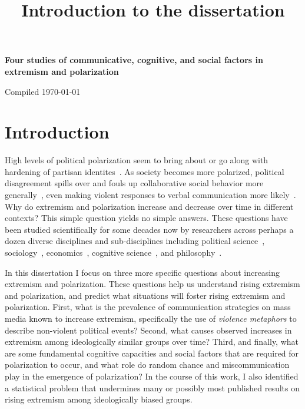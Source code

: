 \documentclass[12pt,letterpaper]{article}
\title{Introduction to the dissertation}
\date{}
\begin{document}

\vspace{-2.5in}
\textbf{Four studies of communicative, cognitive, and social factors in
extremism and polarization} 


Compiled \today

\section{Introduction}

High levels of political polarization seem to bring about or go along with
hardening of partisan identites~\cite{Lee2015}.
As society becomes more polarized, political disagreement spills over
and fouls up collaborative social behavior
more generally~\cite{Iyengar2019}, even making violent responses to verbal 
communication more likely~\cite{Kalmoe2014,Kalmoe2018,Mason2018UncivilAgreementBook}.
Why do extremism and polarization increase and decrease over time in different contexts? 
This simple question yields no simple answers. These questions
have been studied scientifically for some decades now by researchers across perhaps a dozen
diverse disciplines and sub-disciplines including 
political science~\cite{Mason2018UncivilAgreementBook,Boxell2020}, 
sociology~\cite{Baldassarri2007,Flache2011}, 
economics~\cite{Schelling1971,Dixit2007}, cognitive science~\cite{Rollwage2019}, 
and philosophy~\cite{OConnor2018}.

In this dissertation I focus
on three more specific questions about increasing extremism and polarization.
These questions help us understand rising extremism and polarization, and
predict what situations will foster rising extremism and polarization.
First, what is the prevalence of communication strategies on mass media
known to increase extremism, specifically the use of \emph{violence metaphors}
to describe non-violent political events? Second, what causes observed
increases in extremism among ideologically similar groups over time?
Third, and finally, what are some fundamental cognitive capacities and
social factors that are required for polarization to occur, and what
role do random chance and miscommunication play in the emergence of
polarization? In the course of this work, I also identified a statistical
problem that undermines many or possibly most published results on rising
extremism among ideologically biased groups.
\end{document}
